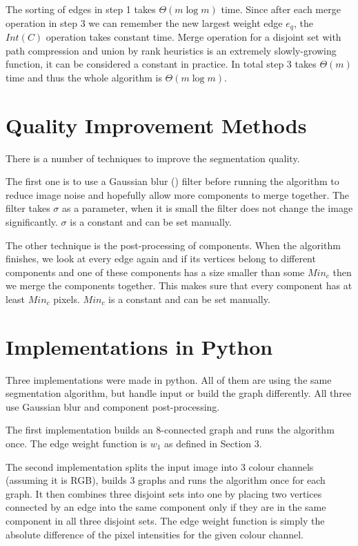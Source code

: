 The sorting of edges in step 1 takes $\Theta(m\log m)$ time. Since after each merge operation in 
step 3 we can remember the new largest weight edge $e_q$, the $Int(C)$ operation takes constant time. Merge operation for a disjoint set with
path compression and union by rank heuristics is an extremely slowly-growing function, it can be considered a constant in practice. In total
step 3 takes $\Theta(m)$ time and thus the whole algorithm is $\Theta(m\log m)$.

\section{Quality Improvement Methods}
There is a number of techniques to improve the segmentation quality. 

The first one is to use a Gaussian blur (\cite{wiki01}) filter before running the algorithm to reduce image noise and hopefully allow more components 
to merge together. The filter takes $\sigma$ as a parameter, when it is small the filter does not change the image significantly. 
$\sigma$ is a constant and can be set manually.

The other technique is the post-processing of components. When the algorithm finishes, we look at every edge again and if its vertices
belong to different components and one of these components has a size smaller than some $Min_c$ then we merge the components together.
This makes sure that every component has at least $Min_c$ pixels. $Min_c$ is a constant and can be set manually.

\section{Implementations in Python}
Three implementations were made in python. All of them are using the same segmentation algorithm, but handle input or build the graph differently.
All three use Gaussian blur and component post-processing.

The first implementation builds an 8-connected graph and runs the algorithm once. The edge weight function is $w_1$ as defined in Section 3.

The second implementation splits the input image into 3 colour channels (assuming it is RGB), builds 3 graphs and runs the algorithm once for
each graph. It then combines three disjoint sets into one by placing two vertices connected by an edge into the same component only if they are
in the same component in all three disjoint sets. 
The edge weight function is simply the absolute difference of the pixel intensities for the given colour channel.

